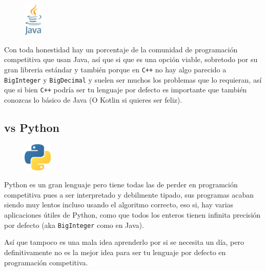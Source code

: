 \documentclass[12pt, fleqn]{report}                             %
\theoremstyle{break}                                            %
\newcommand{\textCode}[1]  { \texttt{#1} }                      %
\newcommand{\Cpp}{\ignorespaces\textCode{C++}}                  %
\begin{document}
                \begin{figure}
                    \centering
                    \includegraphics[width=0.08\textwidth]{Java}
                \end{figure}

                Con toda honestidad hay un porcentaje de la comunidad de programación competitiva que usan Java, así que
                si que es una opción viable, sobretodo por su gran libreria estándar y también porque en \Cpp no hay algo parecido
                a \textCode{BigInteger} y \textCode{BigDecimal} y suelen ser muchos los problemas que lo requieran, así que si bien \Cpp
                podría ser tu lenguaje por defecto es importante que también conozcas lo básico de Java (O Kotlin si quieres ser feliz).

            \subsection{vs Python}

                \begin{figure}
                    \centering
                    \includegraphics[width=0.12\textwidth]{Python}
                \end{figure}

                Python es un gran lenguaje pero tiene todas las de perder en programción competitiva pues
                a ser interpretado y debilmente tipado, sus programas acaban siendo muy lentos incluso usando el 
                algoritmo correcto, eso si, hay varias aplicaciones útiles de Python, como que todos los
                enteros tienen infinita precisión por defecto (aka \textCode{BigInteger} como en Java).

                Así que tampoco es una mala idea aprenderlo por si se necesita un día, pero definitivamente
                no es la mejor idea para ser tu lenguaje por defecto en programación competitiva.
\end{document}
